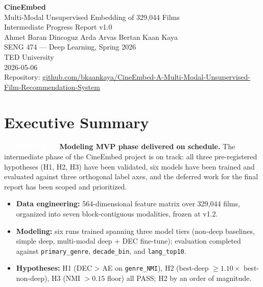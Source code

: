 \documentclass[11pt,a4paper]{article}
\newcommand{\status}[1]{%
  \ifstrequal{#1}{complete}{\colorbox{brandAccent}{\textcolor{white}{\sffamily\bfseries\small\,COMPLETE\,}}}{%
  \ifstrequal{#1}{inprogress}{\colorbox{brandAmber}{\textcolor{white}{\sffamily\bfseries\small\,IN PROGRESS\,}}}{%
  \ifstrequal{#1}{planned}{\colorbox{brandSecondary}{\textcolor{white}{\sffamily\bfseries\small\,PLANNED\,}}}{%
  \ifstrequal{#1}{deferred}{\colorbox{brandSlate}{\textcolor{white}{\sffamily\bfseries\small\,DEFERRED\,}}}{}}}}%
}
\begin{document}
\thispagestyle{empty}
\vspace*{4cm}
\begin{center}
{\sffamily\Huge\bfseries\color{brandPrimary} CineEmbed} \\[0.4cm]
{\sffamily\Large Multi-Modal Unsupervised Embedding of 329{,}044 Films} \\[1.6cm]
{\sffamily\large\color{brandSecondary} Intermediate Progress Report \textbullet{} v1.0} \\[2.5cm]
{\large Ahmet Baran Dincoguz \quad\textbullet\quad Arda Arvas \quad\textbullet\quad Bertan Kaan Kaya} \\[1.0cm]
{\sffamily\normalsize SENG 474 --- Deep Learning, Spring 2026} \\
{\sffamily\normalsize TED University} \\[0.6cm]
{\sffamily\normalsize 2026-05-06} \\[1.5cm]
{\small\color{brandSlate}Repository: \href{https://github.com/bkaankaya/CineEmbed-A-Multi-Modal-Unsupervised-Film-Recommendation-System}{github.com/bkaankaya/CineEmbed-A-Multi-Modal-Unsupervised-Film-Recommendation-System}}
\end{center}
\vfill
\clearpage

\section*{Executive Summary}

\noindent\status{complete}\ \textbf{Modeling MVP phase delivered on schedule.} The intermediate phase of the CineEmbed project is on track: all three pre-registered hypotheses (H1, H2, H3) have been validated, six models have been trained and evaluated against three orthogonal label axes, and the deferred work for the final report has been scoped and prioritized.

\begin{itemize}[leftmargin=1.2em, itemsep=2pt, topsep=2pt]
  \item \textbf{Data engineering:} 564-dimensional feature matrix over 329{,}044 films, organized into seven block-contiguous modalities, frozen at v1.2.
  \item \textbf{Modeling:} six runs trained spanning three model tiers (non-deep baselines, simple deep, multi-modal deep + DEC fine-tune); evaluation completed against \texttt{primary\_genre}, \texttt{decade\_bin}, and \texttt{lang\_top10}.
  \item \textbf{Hypotheses:} H1 (DEC > AE on \texttt{genre\_NMI}), H2 (best-deep $\geq 1.10\times$ best-non-deep), H3 (NMI $> 0.15$ floor) all PASS; H2 by an order of magnitude.
\end{itemize}
\end{document}
